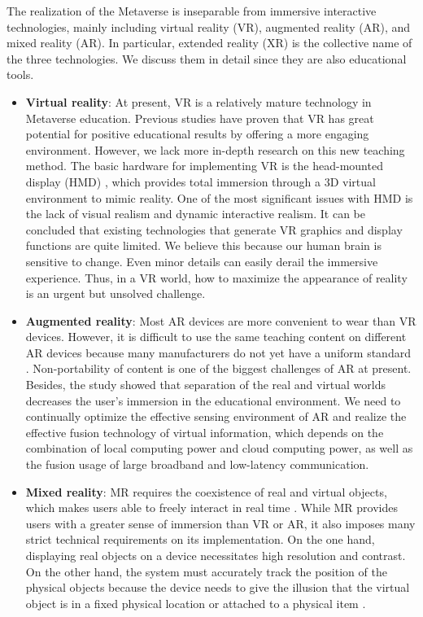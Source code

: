 \documentclass[conference]{IEEEtran}
\begin{document}
The realization of the Metaverse is inseparable from immersive interactive technologies, mainly including virtual reality (VR), augmented reality (AR), and mixed reality (AR). In particular, extended reality (XR) is the collective name of the three technologies. We discuss them in detail since they are also educational tools.

\begin{itemize}
    \item \textbf{Virtual reality}: At present, VR is a relatively mature technology in Metaverse education. Previous studies \cite{hu2021virtual,slater2018immersion} have proven that VR has great potential for positive educational results by offering a more engaging environment. However, we lack more in-depth research on this new teaching method. The basic hardware for implementing VR is the head-mounted display (HMD) \cite{choi2017content}, which provides total immersion through a 3D virtual environment to mimic reality. One of the most significant issues with HMD is the lack of visual realism and dynamic interactive realism. It can be concluded that existing technologies that generate VR graphics and display functions are quite limited. We believe this because our human brain is sensitive to change. Even minor details can easily derail the immersive experience. Thus, in a VR world, how to maximize the appearance of reality is an urgent but unsolved challenge.

    \item \textbf{Augmented reality}: Most AR devices are more convenient to wear than VR devices. However, it is difficult to use the same teaching content on different AR devices because many manufacturers do not yet have a uniform standard \cite{marc2021augmented}. Non-portability of content is one of the biggest challenges of AR at present. Besides, the study \cite{rokhsaritalemi2020review} showed that separation of the real and virtual worlds decreases the user's immersion in the educational environment. We need to continually optimize the effective sensing environment of AR and realize the effective fusion technology of virtual information, which depends on the combination of local computing power and cloud computing power, as well as the fusion usage of large broadband and low-latency communication.

    \item \textbf{Mixed reality}: MR requires the coexistence of real and virtual objects, which makes users able to freely interact in real time \cite{hoenig2015mixed}. While MR provides users with a greater sense of immersion than VR or AR, it also imposes many strict technical requirements on its implementation. On the one hand, displaying real objects on a device necessitates high resolution and contrast. On the other hand, the system must accurately track the position of the physical objects because the device needs to give the illusion that the virtual object is in a fixed physical location or attached to a physical item \cite{costanza2009mixed}.
\end{itemize}
\end{document}
